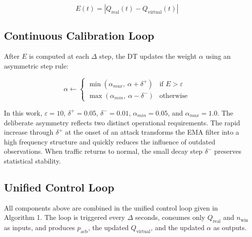 \documentclass[conference]{IEEEtran}
\newcommand{\qreal}{Q_{\mathrm{real}}}
\newcommand{\qvirt}{Q_{\mathrm{virtual}}}
\newcommand{\pacb}{p_{\mathrm{acb}}}
\begin{document}
\begin{equation}
E(t) = \left| \qreal(t) - \qvirt(t) \right|
\label{eq:error}
\end{equation}

\subsection{Continuous Calibration Loop}

After $E$ is computed at each $\Delta$ step, the DT updates the weight $\alpha$ using an asymmetric step rule:

\begin{equation}
\alpha \leftarrow \begin{cases}
    \min(\alpha_{max},\ \alpha + \delta^{+}) & \text{if } E > \varepsilon \\
    \max(\alpha_{min},\ \alpha - \delta^{-}) & \text{otherwise}
\end{cases}
\label{eq:calibration}
\end{equation}

In this work, $\varepsilon = 10$, $\delta^{+} = 0.05$, $\delta^{-} = 0.01$, $\alpha_{min} = 0.05$, and $\alpha_{max} = 1.0$. The deliberate asymmetry reflects two distinct operational requirements. The rapid increase through $\delta^{+}$ at the onset of an attack transforms the EMA filter into a high frequency structure and quickly reduces the influence of outdated observations. When traffic returns to normal, the small decay step $\delta^{-}$ preserves statistical stability.

\subsection{Unified Control Loop}

All components above are combined in the unified control loop given in Algorithm 1. The loop is triggered every $\Delta$ seconds, consumes only $\qreal$ and $n_{\mathrm{win}}$ as inputs, and produces $\pacb$, the updated $\qvirt$, and the updated $\alpha$ as outputs.
\end{document}
